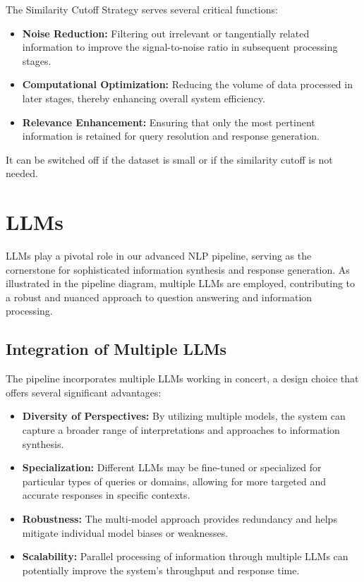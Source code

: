 The Similarity Cutoff Strategy serves several critical functions:
\begin{itemize}
    \item \textbf{Noise Reduction:} Filtering out irrelevant or tangentially related information to improve the signal-to-noise ratio in subsequent processing stages.
    \item \textbf{Computational Optimization:} Reducing the volume of data processed in later stages, thereby enhancing overall system efficiency.
    \item \textbf{Relevance Enhancement:} Ensuring that only the most pertinent information is retained for query resolution and response generation.
\end{itemize}

It can be switched off if the dataset is small or if the similarity cutoff is not needed.

\section{LLMs}\label{sec:large-language-models-llms-in-the-pipeline}
\ac{LLMs} play a pivotal role in our advanced NLP pipeline, serving as the cornerstone for sophisticated information synthesis and response generation.
As illustrated in the pipeline diagram, multiple LLMs are employed, contributing to a robust and nuanced approach to question answering and information processing.

\subsection{Integration of Multiple LLMs}\label{subsec:integration-of-multiple-llms}
The pipeline incorporates multiple LLMs working in concert, a design choice that offers several significant advantages:
\begin{itemize}
    \item \textbf{Diversity of Perspectives:} By utilizing multiple models, the system can capture a broader range of interpretations and approaches to information synthesis.
    \item \textbf{Specialization:} Different LLMs may be fine-tuned or specialized for particular types of queries or domains, allowing for more targeted and accurate responses in specific contexts.
    \item \textbf{Robustness:} The multi-model approach provides redundancy and helps mitigate individual model biases or weaknesses.
    \item \textbf{Scalability:} Parallel processing of information through multiple LLMs can potentially improve the system's throughput and response time.
\end{itemize}

